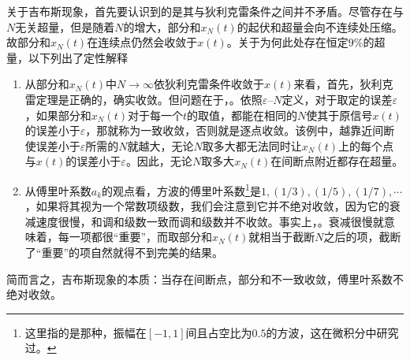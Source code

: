关于吉布斯现象，首先要认识到的是其与狄利克雷条件之间并不矛盾。尽管存在与$N$无关超量，但是随着$N$的增大，部分和$x_N(t)$的起伏和超量会向不连续处压缩。故部分和$x_N(t)$在连续点仍然会收敛于$x(t)$。关于为何此处存在恒定$9\%$的超量，以下列出了定性解释\cite{zhihu:吉布斯}\cite{enwiki:吉布斯}
\begin{enumerate}
    \item 从部分和$x_N(t)$中$N\to\infty$依狄利克雷条件收敛于$x(t)$来看，首先，狄利克雷定理是正确的，确实收敛。但问题在于，。依照$\varepsilon$--$N$定义，对于取定的误差$\varepsilon$，如果部分和$x_N(t)$对于每一个$t$的取值，都能在相同的$N$使其于原信号$x(t)$的误差小于$\varepsilon$，那就称为一致收敛，否则就是逐点收敛。该例中，越靠近间断使误差小于$\varepsilon$所需的$N$就越大，无论$N$取多大都无法同时让$x_N(t)$上的每个点与$x(t)$的误差小于$\varepsilon$。因此，无论$N$取多大$x_N(t)$在间断点附近都存在超量。
    \item 从傅里叶系数$a_k$的观点看，方波的傅里叶系数\footnote{这里指的是那种，振幅在$[-1,1]$间且占空比为$0.5$的方波，这在微积分中研究过。}是$1,(1/3),(1/5),(1/7),\cdots$，如果将其视为一个常数项级数，我们会注意到它并不绝对收敛，因为它的衰减速度很慢，和调和级数一致而调和级数并不收敛。事实上，。衰减很慢就意味着，每一项都很“重要”，而取部分和$x_N(t)$就相当于截断$N$之后的项，截断了“重要”的项自然就得不到完美的结果。
\end{enumerate}
简而言之，吉布斯现象的本质：当存在间断点，部分和不一致收敛，傅里叶系数不绝对收敛。